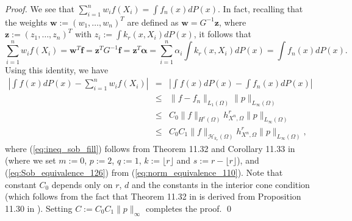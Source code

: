 \documentclass[11pt]{article}
\theoremstyle{remark}
\theoremstyle{example}
\theoremstyle{remark}
\renewcommand{\H}{{\mathcal{H}}}
\newcommand{\bmw}{{\bm w}}
\newcommand{\bmz}{{\bm z}}
\newcommand{\bmalpha}{{\bm \alpha}}
\newcommand{\bmf}{{\bm f}}
\newcommand{\citealp}{\cite}
\begin{document}
\begin{proof}
We see that $\sum_{i=1}^n w_i f(X_i) = \int f_n(x) dP(x)$.
In fact, recalling that the weights ${\bm w} := (w_1,\dots,w_n)^T$ are defined as ${\bm w} = G^{-1} {\bm z}$, where ${\bm z} := (z_1,\dots,z_n)^T$ with $z_i := \int k_r(x,X_i)dP(x)$,
it follows that
\begin{equation*}
\sum_{i=1}^n w_i f(X_i) 
= \bmw^T \bmf = \bmz^T G^{-1} \bmf = \bmz^T \bmalpha  
=\sum_{i=1}^n \alpha_i \int k_r(x,X_i)dP(x)= \int f_n(x) dP(x).
\end{equation*}
Using this identity, we have
\begin{eqnarray}
 \left| \int f(x)dP(x) - \sum_{i=1}^n w_i f(X_i) \right|  
&=& \left| \int f(x)dP(x) - \int f_n(x)dP(x) \right| \nonumber \\
&\leq& \| f - f_n \|_{L_1(\Omega)} \| p \|_{L_\infty(\Omega)} \nonumber %
\\
&\leq & C_0 \| f \|_{H^r(\Omega)} h_{X^n,\Omega}^r \| p \|_{L_\infty(\Omega)} \label{eq:ineq_sob_fill} \\
&\leq & C_0 C_1 \| f \|_{\H_{k_r}(\Omega)} h_{X^n,\Omega}^r \| p \|_{L_\infty(\Omega)}, \label{eq:Sob_equivalence_126} %
\end{eqnarray}
where  
(\ref{eq:ineq_sob_fill}) follows from Theorem 11.32 and Corollary 11.33 in \cite{Wen05} (where we set $m := 0$, $p := 2$, $q := 1$, $k := \lfloor r \rfloor $ and $s := r - \lfloor r \rfloor$), 
and (\ref{eq:Sob_equivalence_126}) from (\ref{eq:norm_equivalence_110}).  
Note that constant $C_0$ depends only on $r$, $d$ and the constants in the interior cone condition (which follows from the fact that Theorem 11.32 in \citealp{Wen05} is derived from Proposition 11.30 in \citealp{Wen05}).  Setting 
$C := C_0 C_1 \| p \|_{\infty}$ completes the proof. \qed
\end{proof}
\end{document}
